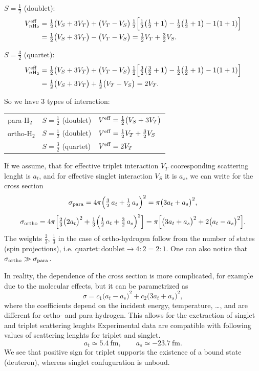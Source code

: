 \documentclass[11pt,a4paper]{article}
\begin{document}
$S=\tfrac12$ (doublet):
\begin{align*}
V^{\rm eff}_{n\rm H_2}&=\tfrac12\big(V_S+3V_T\big)+\big(V_T-V_S\big)\,\tfrac12
\Big[\tfrac12\big(\tfrac12+1\big)-\tfrac12\big(\tfrac12+1\big)-1(1+1)\Big]\\
&=\tfrac12\big(V_S+3V_T\big)-\big(V_T-V_S\big)
=\tfrac12V_T+\tfrac32V_S. 
\end{align*}

$S=\tfrac32$ (quartet):
\begin{align*}
V^{\rm eff}_{n\rm H_2}&=\tfrac12\big(V_S+3V_T\big)+\big(V_T-V_S\big)\,\tfrac12
\Big[\tfrac32\big(\tfrac32+1\big)-\tfrac12\big(\tfrac12+1\big)-1(1+1)\Big]\\
&=\tfrac12\big(V_S+3V_T\big)+\tfrac12\big(V_T-V_S\big)=2V_T .
\end{align*}

So we have 3 types of interaction:
\begin{center}
\renewcommand{\arraystretch}{1.5}
\begin{tabular}{l l l}
para-H$_2$ & $S=\tfrac12$ (doublet) & $V^{\rm eff}=\tfrac12\big(V_S+3V_T\big)$ \\
ortho-H$_2$ & $S=\tfrac12$ (doublet) & $V^{\rm eff}=\tfrac12V_T+\tfrac32V_S$ \\
 & $S=\tfrac32$ (quartet) & $V^{\rm eff}=2V_T$
\end{tabular}
\end{center}
If we assume, that for effective triplet interaction $V_T$ cooresponding scattering lenght is $a_t$, and for effective singlet interaction $V_S$ it is $a_s$, we can write for the cross section 
\[
\sigma_{\rm para}=4\pi\Big(\tfrac32\,a_t+\tfrac12\,a_s\Big)^2=\pi\big(3a_t+a_s\big)^2,
\]
\[
\sigma_{\rm ortho}=4\pi\Big[\tfrac23\big(2a_t\big)^2
+\tfrac13\Big(\tfrac12\,a_t+\tfrac32\,a_s\Big)^2\Big]
=\pi\Big[\big(3a_t+a_s\big)^2+2\big(a_t-a_s\big)^2\Big].
\]
The weights $\tfrac23$, $\tfrac13$ in the case of ortho-hydrogen follow from the number of states (spin projections), i.e. $\text{quartet} : \text{doublet} \rightarrow 4:2=2:1$.
One can also notice that $\sigma_{\rm ortho}\gg\sigma_{\rm para}$.


In reality, the dependence of the cross section is more complicated, for example due to the molecular effects, but it can be parametrized as
\[
\sigma=c_1\big(a_t-a_s\big)^2+c_2\big(3a_t+a_s\big)^2,
\]
where the coefficients depend on the incident energy, temperature, \dots, and
are different for ortho- and para-hydrogen. This allows for the exctraction of singlet and triplet scattering lenghts 
Experimental data are compatible with following values of scattering lenghts for triplet and singlet.   
\[
a_t\simeq5.4\ \text{fm},\qquad a_s\simeq-23.7\ \text{fm}.
\]
We see that positive sign for triplet supports the existence of a bound state (deuteron), whereas singlet confuguration is unboud. 
\end{document}
